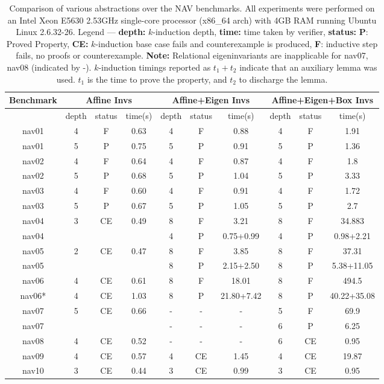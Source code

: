 \documentclass{article}
\begin{document}
\begin{table}[t]
{\small \begin{center}
\begin{tabular}{|c||c|c|c||c|c|c||c|c|c|}
\hline
Benchmark & 
\multicolumn{3}{c||}{Affine Invs} & 
\multicolumn{3}{c||}{Affine+Eigen Invs} & 
\multicolumn{3}{c|}{Affine+Eigen+Box Invs}
\\ \hline
 & depth & status & time(s)
 & depth & status & time(s)
 & depth & status & time(s)
\\ \hline\hline
nav01  
& 4 & F & 0.63
& 4 & F & 0.88
& 4 & F & 1.91
\\ 
nav01  
& 5 & P & 0.75
& 5 & P & 0.91
& 5 & P & 1.36
\\ \hline
nav02
& 4 & F & 0.64
& 4 & F & 0.87
& 4 & F & 1.8
\\ 
nav02
& 5 & P & 0.68
& 5 & P & 1.04
& 5 & P & 3.33
\\ \hline
nav03
& 4 & F & 0.60
& 4 & F & 0.91
& 4 & F & 1.72
\\ 
nav03
& 5 & P & 0.67
& 5 & P & 1.05
& 5 & P & 2.7
\\ \hline
nav04
& 3 & CE & 0.49
& 8 & F & 3.21
& 8 & F & 34.883
\\ 
nav04
& & &  
& 4 & P & 0.75+0.99
& 4 & P & 0.98+2.21
\\ \hline
nav05
& 2 & CE & 0.47
& 8 & F & 3.85
& 8 & F & 37.31
\\ 
nav05
& & &
& 8 & P & 2.15+2.50
& 8 & P & 5.38+11.05
\\ \hline
nav06
& 4 & CE & 0.61
& 8 & F & 18.01
& 8 & F & 494.5
\\ 
nav06*
& 4 & CE & 1.03
& 8 & P & 21.80+7.42  
& 8 & P & 40.22+35.08  
\\ \hline
nav07
& 5 & CE & 0.66
& - & - & - 
& 5 & F & 69.9 
\\ 
nav07
& & &
& - & - &- 
& 6 & P & 6.25 
\\ \hline
nav08
& 4 & CE & 0.52
& - & - &- 
& 6 & CE & 0.95
\\ \hline
nav09
& 4 & CE & 0.57
& 4 & CE & 1.45
& 4 & CE & 19.87
\\ \hline
nav10
& 3 & CE & 0.44
& 3 & CE & 0.99
& 3 & CE & 0.95
\\ \hline
\end{tabular}
\end{center}
}
\caption{Comparison of various abstractions over the NAV
  benchmarks. All experiments were performed on an Intel Xeon E5630 2.53GHz
  single-core processor (x86\_64 arch) with 4GB RAM running Ubuntu
  Linux 2.6.32-26.  Legend --- \textbf{depth:}
  $k$-induction depth, \textbf{time:} time taken by verifier,
  \textbf{status:}  \textbf{P}: Proved
  Property, \textbf{CE:} $k$-induction base case fails and
  counterexample is produced, \textbf{F}: inductive step fails, no
  proofs or counterexample.  \textbf{Note:} Relational
  eigeninvariants are inapplicable for nav07, nav08 (indicated by -).  
$k$-induction timings  reported as $t_1+t_2$ indicate that an auxiliary lemma was used. $t_1$ is the time to prove the
  property, and $t_2$  to discharge the
 lemma.
}\label{table-exp}
\end{table}
\end{document}
